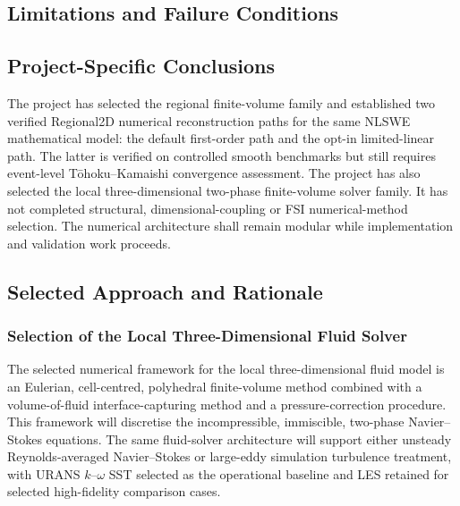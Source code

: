 \subsection{Limitations and Failure Conditions}
\label{sec:res-num-spec-limitations}


\subsection{Project-Specific Conclusions}
\label{sec:res-num-spec-conclusions}


The project has selected the regional finite-volume family and
established two verified Regional2D numerical reconstruction paths for
the same NLSWE mathematical model: the default first-order path and the
opt-in limited-linear path. The latter is verified on controlled smooth
benchmarks but still requires event-level Tōhoku--Kamaishi convergence
assessment. The project has also selected the local three-dimensional
two-phase finite-volume solver family. It has not completed structural,
dimensional-coupling or FSI numerical-method selection. The numerical
architecture shall remain modular while implementation and validation
work proceeds.

\subsection{Selected Approach and Rationale}
\label{sec:res-num-spec-selected-approach}


\subsubsection{Selection of the Local Three-Dimensional Fluid Solver}
\label{sec:num-local-three-dimensional-fluid-solver-selection}

The selected numerical framework for the local three-dimensional fluid
model is an Eulerian, cell-centred, polyhedral finite-volume method
combined with a volume-of-fluid interface-capturing method and a
pressure-correction procedure. This framework will discretise the
incompressible, immiscible, two-phase Navier--Stokes equations. The same
fluid-solver architecture will support either unsteady
Reynolds-averaged Navier--Stokes or large-eddy simulation turbulence
treatment, with URANS $k$--$\omega$ SST selected as the operational
baseline and LES retained for selected high-fidelity comparison cases.

